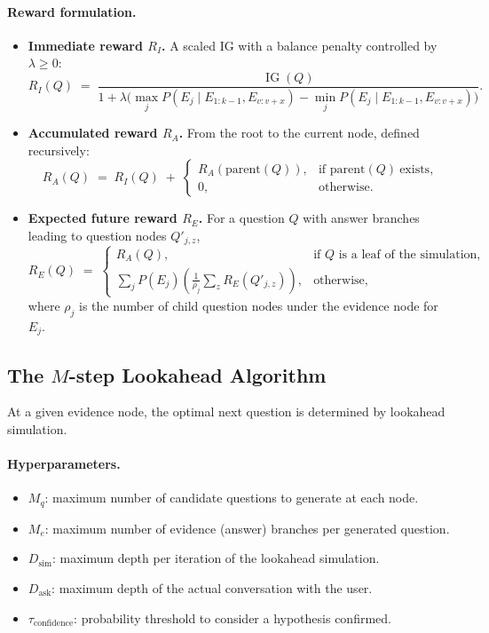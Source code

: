 \documentclass{article} %
\begin{document}
\paragraph{Reward formulation.}
\begin{itemize}
\item \noindent\textbf{Immediate reward $R_I$.} A scaled IG with a balance penalty controlled by $\lambda\ge 0$:
\[
R_I(Q)\;=\;\frac{\operatorname{IG}(Q)}{1+\lambda\big(\max_j P(E_j\mid E_{1:k-1},E_{v:v+x})
- \min_j P(E_j\mid E_{1:k-1},E_{v:v+x})\big)}.
\]

\item \noindent \noindent\textbf{Accumulated reward $R_A$.}
From the root to the current node, defined recursively:
\[
R_A(Q)\;=\;R_I(Q)\;+\;
\begin{cases}
R_A(\mathrm{parent}(Q)), & \text{if parent}(Q)\ \text{exists},\\[2pt]
0, & \text{otherwise.}
\end{cases}
\]

\item \noindent\textbf{Expected future reward $R_E$.}
For a question $Q$ with answer branches leading to question nodes $Q'_{j,z}$,
\[
R_E(Q)\;=\;
\begin{cases}
R_A(Q), & \text{if $Q$ is a leaf of the simulation},\\[4pt]
\displaystyle \sum_{j} P(E_j)\left(\frac{1}{\rho_j}\sum_{z} R_E\!\left(Q'_{j,z}\right)\right), & \text{otherwise,}
\end{cases}
\]
where $\rho_j$ is the number of child question nodes under the evidence node for $E_j$.
\end{itemize}

\subsection{The $M$-step Lookahead Algorithm}
At a given evidence node, the optimal next question is determined by lookahead simulation.

\paragraph{Hyperparameters.}
\begin{itemize}
  \item $M_q$: maximum number of candidate questions to generate at each node.
  \item $M_e$: maximum number of evidence (answer) branches per generated question.
  \item $D_{\text{sim}}$: maximum depth per iteration of the lookahead simulation.
  \item $D_{\text{ask}}$: maximum depth of the actual conversation with the user.
  \item $\tau_{\text{confidence}}$: probability threshold to consider a hypothesis confirmed.
\end{itemize}
\end{document}
